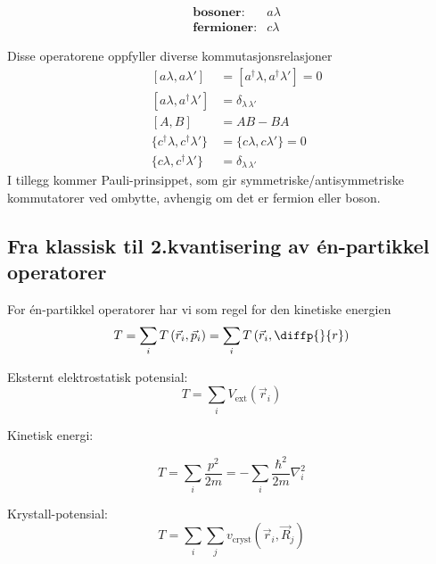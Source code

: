 \begin{align*}
&\textbf{bosoner}: &a\lambda \\ 
&\textbf{fermioner}: &c\lambda
\end{align*}


Disse operatorene oppfyller diverse kommutasjonsrelasjoner
\begin{align}
&[a\lambda, a\lambda'] & = [a^\dagger\lambda, a^\dagger\lambda'] = 0 \\
&[a\lambda, a^\dagger\lambda'] & = \delta_{\lambda\,\lambda'} \\
&[A,B] &= AB-BA \\
&\{c^\dagger\lambda, c^\dagger\lambda'\} & = \{c\lambda, c\lambda'\} = 0 \\
&\{c\lambda, c^\dagger\lambda'\} & = \delta_{\lambda\,\lambda'} 
\end{align}
I tillegg kommer Pauli-prinsippet, som gir symmetriske/antisymmetriske kommutatorer ved ombytte, avhengig om det er fermion eller boson. 

\subsection{Fra klassisk til 2.kvantisering av én-partikkel operatorer}

For én-partikkel operatorer har vi som regel for den kinetiske energien
\begin{equation}
T = \sum_i T\left(\vec{r}_i, \vec{p}_i\right) = \sum_i T\left(\vec{r}_i, \diffp{}{r}\right)
\end{equation}
\begin{theorem}
Eksternt elektrostatisk potensial:
\begin{equation}
T = \sum_i V_{\text{ext}}\left(\vec{r}_i\right)
\end{equation}
\end{theorem}
\begin{theorem}

Kinetisk energi:

\begin{equation}
T = \sum_i \frac{p^2}{2m} = -\sum_i \frac{\hbar^2}{2m}\nabla_i^2
\end{equation}
\end{theorem}

\begin{theorem}
Krystall-potensial:
\begin{equation}
T = \sum_i \sum_j v_{\text{cryst}} \left( \vec{r}_i, \vec{R}_j \right)
\end{equation}
\end{theorem}

